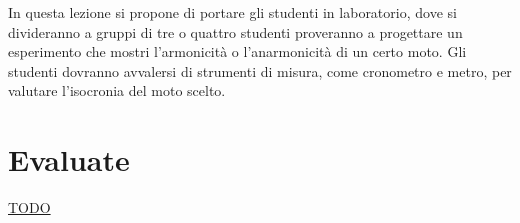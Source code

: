 \documentclass{article}
\begin{document}
In questa lezione si propone di portare gli studenti
in laboratorio, dove si divideranno a gruppi di tre
o quattro studenti proveranno a progettare un esperimento
che mostri l'armonicità o l'anarmonicità di un certo moto.
Gli studenti dovranno avvalersi di strumenti di misura,
come cronometro e metro, per valutare l'isocronia del
moto scelto.

\section{Evaluate}
\underline{TODO}

{}

\end{document}
